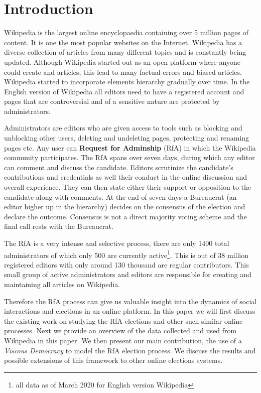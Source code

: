\section{Introduction}
\label{sec:introduction}

Wikipedia is the largest online encyclopaedia containing over 5 million pages of content. It is one the most popular websites on the Internet. Wikipedia has a diverse collection of articles from many different topics and is constantly being updated. Although Wikipedia started out as an open platform where anyone could create and articles, this lead to many factual errors and biased articles. Wikipedia started to incorporate elements hierarchy gradually over time. In the English version of Wikipedia all editors need to have a registered account and pages that are controversial and of a sensitive nature are protected by administrators.

Administrators are editors who are given access to tools such as blocking and unblocking other users, deleting and undeleting pages, protecting and renaming pages etc. Any user can \textbf{Request for Adminship} (RfA) in which the Wikipedia community participates. The RfA spans over seven days, during which any editor can comment and discuss the candidate. Editors scrutinize the candidate's contributions and credentials as well their conduct in the online discussion and overall experience. They can then state either their support or opposition to the candidate along with comments. At the end of seven days a Bureaucrat (an editor higher up in the hierarchy) decides on the consensus of the election and declare the outcome. Consensus is not a direct majority voting scheme and the final call rests with the Bureaucrat.

The RfA is a very intense and selective process, there are only 1400 total administrators of which only 500 are currently active\footnote{all data as of March 2020 for English version Wikipedia}. This is out of 38 million registered editors with only around 130 thousand are regular contributors. This small group of active administrators and editors are responsible for creating and maintaining all articles on Wikipedia.

Therefore the RfA process can give us valuable insight into the dynamics of social interactions and elections in an online platform. In this paper we will first discuss the existing work on studying the RfA elections and other such similar online processes. Next we provide an overview of the data collected and used from Wikipedia in this paper. We then present our main contribution, the use of a \textit{Viscous Democracy} to model the RfA election process. We discuss the results and possible extensions of this framework to other online elections systems.  
